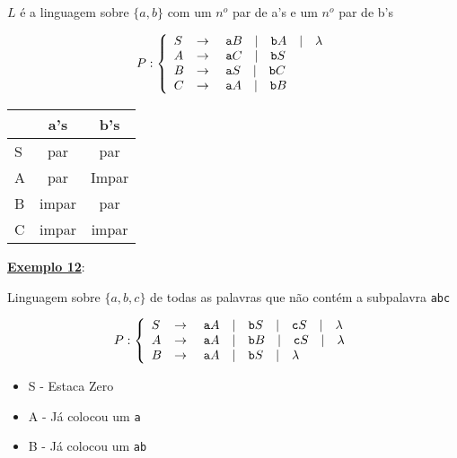 \begin{center}
$L$ é a linguagem sobre $\{a, b\}$ com um $n^{o}$ par de a's e um $n^{o}$ par de b's\\
  \makebox[\linewidth]{\rule{\paperwidth/2}{0.4pt}}
\end{center}
{\color{blue}
\begin{flushleft}
   \[
      P:\left\{
      \begin{array}{l c l}
        S & \rightarrow & \ \texttt{a}B \quad | \quad \texttt{b}A\quad | \quad \lambda  \\
        A & \rightarrow & \ \texttt{a}C \quad | \quad \texttt{b}S \\
        B & \rightarrow & \ \texttt{a}S \quad | \quad \texttt{b}C \\
        C & \rightarrow & \ \texttt{a}A \quad | \quad \texttt{b}B \\
      \end{array}
      \right.
  \]
\begin{center}
\begin{tabular}{l | c c}
  & a's & b's\\
  \hline
S & par & par\\
A & par & Impar\\
B & impar & par\\
C & impar & impar
\end{tabular}
\end{center}

\end{flushleft}
}

\vspace{1cm}
\textbf{\underline{Exemplo 12}}:\\

\begin{center}
Linguagem sobre $\{a, b, c\}$ de todas as palavras que não contém a subpalavra \texttt{abc}\\
  \makebox[\linewidth]{\rule{\paperwidth/2}{0.4pt}}
\end{center}
{\color{blue}
\begin{flushleft}
   \[
      P:\left\{
      \begin{array}{l c l}
        S & \rightarrow & \ \texttt{a}A \quad | \quad \texttt{b}S \quad | \quad \texttt{c}S \quad | \quad \lambda  \\
        A & \rightarrow & \ \texttt{a}A \quad | \quad \texttt{b}B \quad | \quad \texttt{c}S \quad | \quad \lambda  \\
        B & \rightarrow & \ \texttt{a}A \quad | \quad \texttt{b}S \quad | \quad \lambda  \\
      \end{array}
      \right.
  \]
\begin{center}
\begin{itemize}
 \item S - Estaca Zero
 \item A - Já colocou um \texttt{a}
 \item B - Já colocou um \texttt{ab}
\end{itemize}

\end{center}

\end{flushleft}
}

